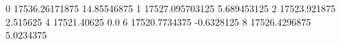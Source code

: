 0 17536.26171875 14.85546875
1 17527.095703125 5.689453125
2 17523.921875 2.515625
4 17521.40625 0.0
6 17520.7734375 -0.6328125
8 17526.4296875 5.0234375
